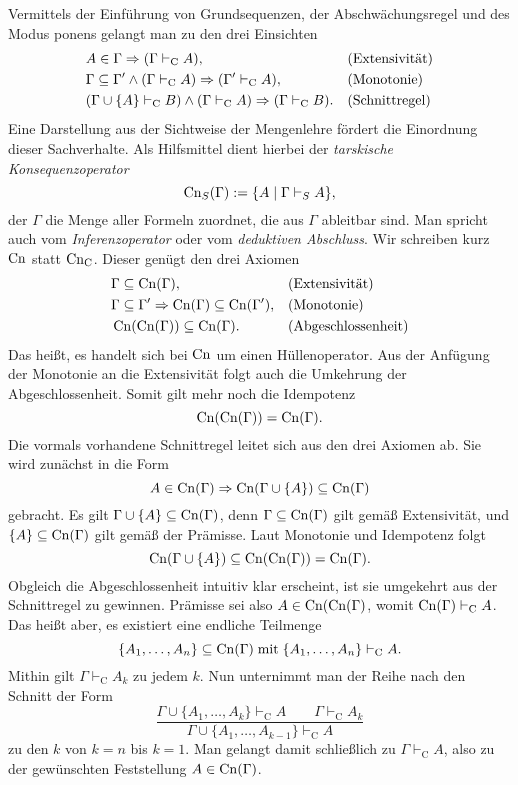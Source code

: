 Vermittels der Einführung von Grundsequenzen, der Abschwächungsregel
und des Modus ponens gelangt man zu den drei Einsichten%
\begin{align*}
&A\in\Gamma\Rightarrow (\Gamma\vdash_{\mathrm C} A),
  &&\text{(Extensivität)}\\
&\Gamma\subseteq\Gamma'\land (\Gamma\vdash_{\mathrm C} A)\Rightarrow
  (\Gamma'\vdash_{\mathrm C} A), &&\text{(Monotonie)}\\
&(\Gamma\cup\{A\}\vdash_{\mathrm C} B)\land (\Gamma\vdash_{\mathrm C} A)\Rightarrow
  (\Gamma\vdash_{\mathrm C} B). &&\text{(Schnittregel)}
\end{align*}
Eine Darstellung aus der Sichtweise der Mengenlehre fördert die Einordnung
dieser Sachverhalte. Als Hilfsmittel dient hierbei der
\emph{tarskische Konsequenzoperator}%
\[\operatorname{Cn}_S(\Gamma) := \{A\mid \Gamma\vdash_S A\},\]
der $\Gamma$ die Menge aller Formeln zuordnet,
die aus $\Gamma$ ableitbar sind. Man spricht auch vom
\emph{Inferenzoperator} oder vom \emph{deduktiven Abschluss}.
Wir schreiben kurz $\operatorname{Cn}$ statt $\operatorname{Cn}_{\mathrm C}$. Dieser genügt den
drei Axiomen
\begin{align*}
&\Gamma\subseteq\operatorname{Cn}(\Gamma), &&\text{(Extensivität)}\\
&\Gamma\subseteq\Gamma'\Rightarrow \operatorname{Cn}(\Gamma)\subseteq\operatorname{Cn}(\Gamma'), &&\text{(Monotonie)}\\
&\operatorname{Cn}(\operatorname{Cn}(\Gamma)) \subseteq \operatorname{Cn}(\Gamma). &&\text{(Abgeschlossenheit)}
\end{align*}
Das heißt, es handelt sich bei $\operatorname{Cn}$ um einen Hüllenoperator. Aus der
Anfügung der Monotonie an die Extensivität folgt auch die Umkehrung
der Abgeschlossenheit. Somit gilt mehr noch die Idempotenz
\[\operatorname{Cn}(\operatorname{Cn}(\Gamma)) = \operatorname{Cn}(\Gamma).\]
Die vormals
vorhandene Schnittregel leitet sich aus den drei Axiomen ab.
Sie wird zunächst in die Form%
\[A\in\operatorname{Cn}(\Gamma)\Rightarrow\operatorname{Cn}(\Gamma\cup\{A\})\subseteq\operatorname{Cn}(\Gamma)\]
gebracht. Es gilt $\Gamma\cup\{A\}\subseteq\operatorname{Cn}(\Gamma)$, denn
$\Gamma\subseteq\operatorname{Cn}(\Gamma)$ gilt gemäß Extensivität, und
$\{A\}\subseteq\operatorname{Cn}(\Gamma)$ gilt gemäß der Prämisse.
Laut Monotonie und Idempotenz folgt%
\[\operatorname{Cn}(\Gamma\cup\{A\})\subseteq\operatorname{Cn}(\operatorname{Cn}(\Gamma)) = \operatorname{Cn}(\Gamma).\]
Obgleich die Abgeschlossenheit intuitiv klar erscheint, ist sie
umgekehrt aus der Schnittregel zu gewinnen. Prämisse sei also
$A\in\operatorname{Cn}(\operatorname{Cn}(\Gamma)$, womit $\operatorname{Cn}(\Gamma)\vdash_{\mathrm C} A$. Das heißt aber,
es existiert eine endliche Teilmenge
\[\{A_1,\ldots,A_n\}\subseteq\operatorname{Cn}(\Gamma)\;\text{mit}\;
\{A_1,\ldots,A_n\}\vdash_{\mathrm C} A.\]
Mithin gilt $\Gamma\vdash_{\mathrm C} A_k$ zu jedem $k$.
Nun unternimmt man der Reihe nach den Schnitt der Form
\[\dfrac{\Gamma\cup\{A_1,\ldots,A_k\}\vdash_{\mathrm C} A\qquad\Gamma\vdash_{\mathrm C} A_k}
{\Gamma\cup\{A_1,\ldots,A_{k-1}\}\vdash_{\mathrm C} A}\]
zu den $k$ von $k=n$ bis $k=1$. Man gelangt damit schließlich zu
$\Gamma\vdash_{\mathrm C} A$, also zu der gewünschten Feststellung $A\in\operatorname{Cn}(\Gamma)$.

